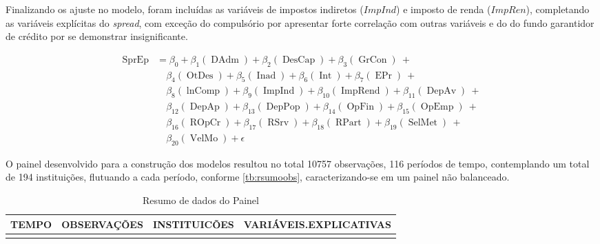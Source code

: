 \documentclass[
  12pt,
  12pt,
  openright,
  oneside,
  a4paper,
  chapter=TITLE,
  section=TITLE,
  subsection=TITLE,
  subsubsection=TITLE,
  english,
  portugues,
  sumario=tradicional]{abntex2}
\begin{document}
Finalizando os ajuste no modelo, foram incluídas as variáveis de impostos indiretos (\(ImpInd\)) e imposto de renda (\(ImpRen\)), completando as variáveis explícitas do \emph{spread}, com exceção do compulsório por apresentar forte correlação com outras variáveis e do do fundo garantidor de crédito por se demonstrar insignificante.

\begin{equation}
\begin{aligned}
\operatorname{SprEp} &= \beta_{0} + \beta_{1}(\operatorname{DAdm}) + \beta_{2}(\operatorname{DesCap}) + \beta_{3}(\operatorname{GrCon})\ + \\
&\quad \beta_{4}(\operatorname{OtDes}) + \beta_{5}(\operatorname{Inad}) + \beta_{6}(\operatorname{Int}) + \beta_{7}(\operatorname{EPr})\ + \\
&\quad \beta_{8}(\operatorname{lnComp}) + \beta_{9}(\operatorname{ImpInd}) + \beta_{10}(\operatorname{ImpRend}) + \beta_{11}(\operatorname{DepAv})\ + \\
&\quad \beta_{12}(\operatorname{DepAp}) + \beta_{13}(\operatorname{DepPop}) + \beta_{14}(\operatorname{OpFin}) + \beta_{15}(\operatorname{OpEmp})\ + \\
&\quad \beta_{16}(\operatorname{ROpCr}) + \beta_{17}(\operatorname{RSrv}) + \beta_{18}(\operatorname{RPart}) + \beta_{19}(\operatorname{SelMet})\ + \\
&\quad \beta_{20}(\operatorname{VelMo}) + \epsilon
\end{aligned}
\end{equation}

O painel desenvolvido para a construção dos modelos resultou no total 10757 observações, 116 períodos de tempo, contemplando um total de 194 instituições, flutuando a cada período, conforme \autoref{tb:rsumoobs}, caracterizando-se em um painel não balanceado.

\begin{table}[!h]
\caption{Resumo de dados do Painel}
\begingroup\fontsize{10}{12}\selectfont

\begin{tabu} to 
\toprule
TEMPO & OBSERVAÇÕES & INSTITUICÕES & VARIÁVEIS.EXPLICATIVAS\\
\midrule
{} &  &  & \\
\bottomrule
\end{tabu}
\endgroup{}
\label{tb:rsumoobs}
\end{table}
\end{document}
